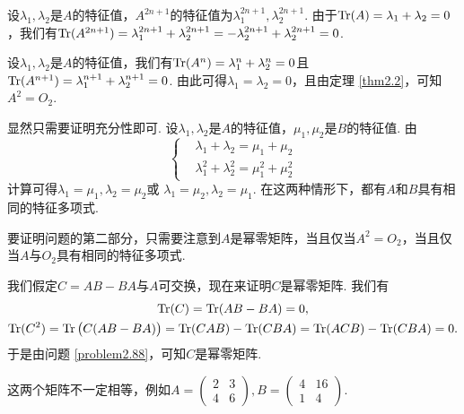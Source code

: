 \setcounter{solution}{84}

\begin{solution}
  设$\lambda_1,\lambda_2$是$A$的特征值，$A^{2n+1}$的特征值为$\lambda_1^{2n+1},\lambda_2^{2n+1}$. 由于$\operatorname{Tr}(A)=\lambda_1+\lambda_2=0$，我们有$\operatorname{Tr}(A^{2n+1})=\lambda_1^{2n+1}+\lambda_2^{2n+1}=-\lambda_2^{2n+1}
  +\lambda_2^{2n+1}=0$.
\end{solution}

\setcounter{solution}{86}

\begin{solution}
  设$\lambda_1,\lambda_2$是$A$的特征值，我们有$\operatorname{Tr}(A^n)=\lambda_1^n+\lambda_2^n=0$且$\operatorname{Tr}(A^{n+1})=\lambda_1^{n+1}+\lambda_2^{n+1}=0$. 由此可得$\lambda_1=\lambda_2=0$，且由定理 \ref{thm2.2}，可知$A^2=O_2$.
\end{solution}

\begin{solution}
  显然只需要证明充分性即可. 设$\lambda_1,\lambda_2$是$A$的特征值，$\mu_1,\mu_2$是$B$的特征值. 由
  \[
    \left\{
      \begin{aligned}
        & \lambda_1 + \lambda_2 = \mu_1 + \mu_2 \\
        & \lambda_1^2 + \lambda_2^2 = \mu_1^2 + \mu_2^2
      \end{aligned}
    \right.
  \]
  计算可得$\lambda_1=\mu_1,\lambda_2=\mu_2$或
  $\lambda_1=\mu_2,\lambda_2=\mu_1$. 在这两种情形下，都有$A$和$B$具有相同的特征多项式.

  要证明问题的第二部分，只需要注意到$A$是幂零矩阵，当且仅当$A^2=O_2$，当且仅当$A$与$O_2$具有相同的特征多项式.
\end{solution}

\begin{solution}
  我们假定$C=AB-BA$与$A$可交换，现在来证明$C$是幂零矩阵. 我们有
  \begin{gather*}
    \operatorname{Tr}(C)  = \operatorname{Tr}(AB - BA) = 0, \\
    \operatorname{Tr}(C^2)  = \operatorname{Tr}\big( C(AB - BA) \big) = \operatorname{Tr}(CAB) - \operatorname{Tr}(CBA) = \operatorname{Tr}(ACB) - \operatorname{Tr}(CBA) = 0.
  \end{gather*}
  于是由问题 \ref{problem2.88}，可知$C$是幂零矩阵.
\end{solution}

\begin{solution}
  这两个矩阵不一定相等，例如$A=\begin{pmatrix}
    2 & 3\\
    4 & 6
  \end{pmatrix},B=\begin{pmatrix}
    4 & 16 \\
    1 & 4
  \end{pmatrix}$.
\end{solution}

